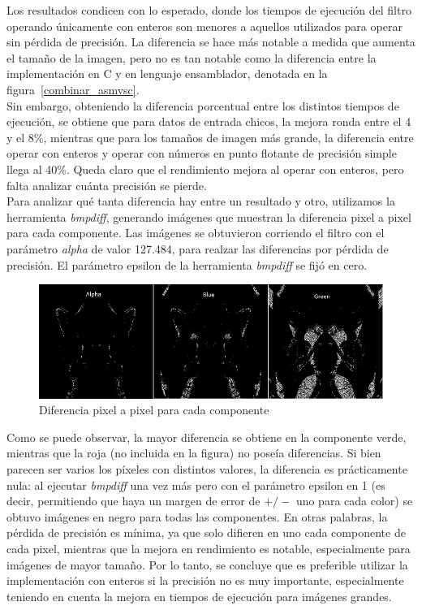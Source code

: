 \documentclass[a4paper]{article}
\begin{document}
Los resultados condicen con lo esperado, donde los tiempos de ejecución del filtro operando únicamente con enteros son menores a aquellos utilizados para operar sin pérdida de precisión. La diferencia se hace más notable a medida que aumenta el tamaño de la imagen, pero no es tan notable como la diferencia entre la implementación en C y en lenguaje ensamblador, denotada en la figura~\ref{combinar_asmvsc}.
\\Sin embargo, obteniendo la diferencia porcentual entre los distintos tiempos de ejecución, se obtiene que para datos de entrada chicos, la mejora ronda entre el 4 y el 8\%, mientras que para los tamaños de imagen más grande, la diferencia entre operar con enteros y operar con números en punto flotante de precisión simple llega al 40\%. Queda claro que el rendimiento mejora al operar con enteros, pero falta analizar cuánta precisión se pierde.
\\Para analizar qué tanta diferencia hay entre un resultado y otro, utilizamos la herramienta \textit{bmpdiff}, generando imágenes que muestran la diferencia pixel a pixel para cada componente. Las imágenes se obtuvieron corriendo el filtro con el parámetro \textit{alpha} de valor 127.484, para realzar las diferencias por pérdida de precisión. El parámetro epsilon de la herramienta \textit{bmpdiff} se fijó en cero.
\\
\begin{figure}[H]
  \begin{center}
	\includegraphics[scale=0.66]{imagenes/diffExp.jpg}
	\caption{Diferencia pixel a pixel para cada componente}
	\label{combinar_diff}
  \end{center}
\end{figure}
Como se puede observar, la mayor diferencia se obtiene en la componente verde, mientras que la roja (no incluida en la figura) no poseía diferencias. Si bien parecen ser varios los píxeles con distintos valores, la diferencia es prácticamente nula: al ejecutar \textit{bmpdiff} una vez más pero con el parámetro epsilon en 1 (es decir, permitiendo que haya un margen de error de $+/-$ uno para cada color) se obtuvo imágenes en negro para todas las componentes. En otras palabras, la pérdida de precisión es mínima, ya que solo difieren en uno cada componente de cada pixel, mientras que la mejora en rendimiento es notable, especialmente para imágenes de mayor tamaño. Por lo tanto, se concluye que es preferible utilizar la implementación con enteros si la precisión no es muy importante, especialmente teniendo en cuenta la mejora en tiempos de ejecución para imágenes grandes.
\end{document}
